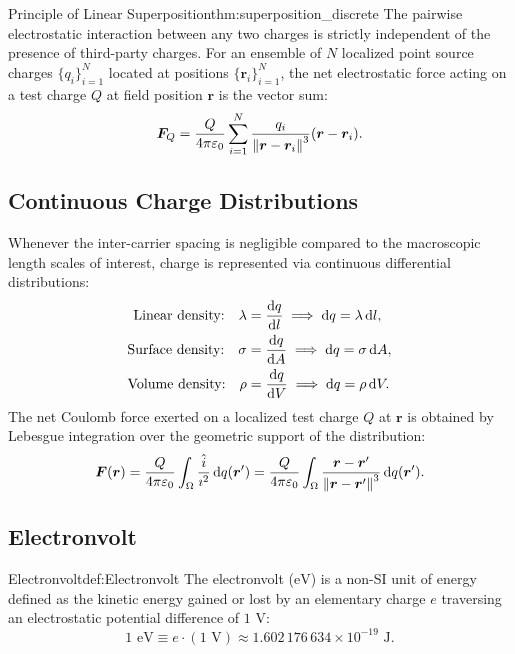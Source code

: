 \begin{theorem}{Principle of Linear Superposition}{thm:superposition_discrete}
The pairwise electrostatic interaction between any two charges is strictly independent of the presence of third-party charges. For an ensemble of $N$ localized point source charges $\{q_i\}_{i=1}^N$ located at positions $\{\bm{r}_i\}_{i=1}^N$, the net electrostatic force acting on a test charge $Q$ at field position $\bm{r}$ is the vector sum:
\begin{equation}
    \bm{F}_Q = \frac{Q}{4\pi\varepsilon_0} \sum_{i=1}^N \frac{q_i}{\norm{\bm{r} - \bm{r}_i}^3} (\bm{r} - \bm{r}_i).
\end{equation}
\end{theorem}

\subsection[Continuous Charge Distributions]{Continuous Charge Distributions}

Whenever the inter-carrier spacing is negligible compared to the macroscopic length scales of interest, charge is represented via continuous differential distributions:
\begin{align}
    \text{Linear density:} \quad \lambda &= \dv{q}{l} \implies \dd q = \lambda \, \dd l, \\
    \text{Surface density:} \quad \sigma &= \dv{q}{A} \implies \dd q = \sigma \, \dd A, \\
    \text{Volume density:} \quad \rho &= \dv{q}{V} \implies \dd q = \rho \, \dd V.
\end{align}
The net Coulomb force exerted on a localized test charge $Q$ at $\bm{r}$ is obtained by Lebesgue integration over the geometric support of the distribution:
\begin{equation}
    \bm{F}(\bm{r}) = \frac{Q}{4\pi\varepsilon_0} \int_\Omega \frac{\hat{i}}{\imath^2} \, \dd q(\bm{r}') = \frac{Q}{4\pi\varepsilon_0} \int_\Omega \frac{\bm{r} - \bm{r}'}{\norm{\bm{r} - \bm{r}'}^3} \, \dd q(\bm{r}').
\end{equation}

\subsection{Electronvolt}

\begin{definition}{Electronvolt}{def:Electronvolt}
 The electronvolt ($\text{eV}$) is a non-SI unit of energy defined as the kinetic energy gained or lost by an elementary charge $e$ traversing an electrostatic potential difference of $1\text{ V}$:
\begin{equation}
    1\text{ eV} \equiv e \cdot (1\text{ V}) \approx 1.602\,176\,634 \times 10^{-19}\text{ J}.
\end{equation}
\end{definition}

